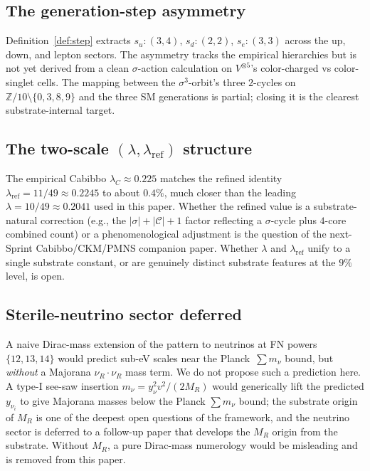 \documentclass[11pt,reqno]{amsart}
\theoremstyle{plain}
\theoremstyle{definition}
\theoremstyle{remark}
\newcommand{\Z}{\mathbb{Z}}
\newcommand{\Cfour}{\mathcal{C}}  %
\begin{document}
\subsection{The generation-step asymmetry}
Definition~\ref{def:step} extracts $s_{u} : (3, 4)$, $s_{d} :
(2, 2)$, $s_{e} : (3, 3)$ across the up, down, and lepton
sectors. The asymmetry tracks the empirical hierarchies but is
not yet derived from a clean $\sigma$-action calculation on
$V^{\otimes 5}$'s color-charged vs color-singlet cells. The
mapping between the $\sigma^{3}$-orbit's three $2$-cycles on
$\Z/10\setminus\{0,3,8,9\}$ and the three SM generations is
partial; closing it is the clearest substrate-internal target.

\subsection{The two-scale $(\lambda, \lambda_{\mathrm{ref}})$ structure}
The empirical Cabibbo $\lambda_{C} \approx 0.225$ matches the
refined identity $\lambda_{\mathrm{ref}} = 11/49 \approx
0.2245$ to about $0.4\%$, much closer than the leading
$\lambda = 10/49 \approx 0.2041$ used in this paper. Whether
the refined value is a substrate-natural correction (e.g.,
the $|\sigma| + |\Cfour| + 1$ factor reflecting a
$\sigma$-cycle plus $4$-core combined count) or a
phenomenological adjustment is the question of the next-Sprint
Cabibbo/CKM/PMNS companion paper. Whether $\lambda$ and
$\lambda_{\mathrm{ref}}$ unify to a single substrate constant,
or are genuinely distinct substrate features at the $9\%$
level, is open.

\subsection{Sterile-neutrino sector deferred}
A naive Dirac-mass extension of the pattern to neutrinos at FN
powers $\{12, 13, 14\}$ would predict sub-eV scales near the
Planck~$\sum m_{\nu}$ bound, but \emph{without} a Majorana
$\nu_{R} \cdot \nu_{R}$ mass term. We do not propose such a
prediction here. A type-I see-saw insertion $m_{\nu} =
y_{\nu}^{2} v^{2}/(2 M_{R})$ would generically lift the
predicted $y_{\nu_{i}}$ to give Majorana masses below the
Planck $\sum m_{\nu}$ bound; the substrate origin of $M_{R}$
is one of the deepest open questions of the framework, and
the neutrino sector is deferred to a follow-up paper that
develops the $M_R$ origin from the substrate. Without
$M_R$, a pure Dirac-mass numerology would be misleading and
is removed from this paper.
\end{document}
